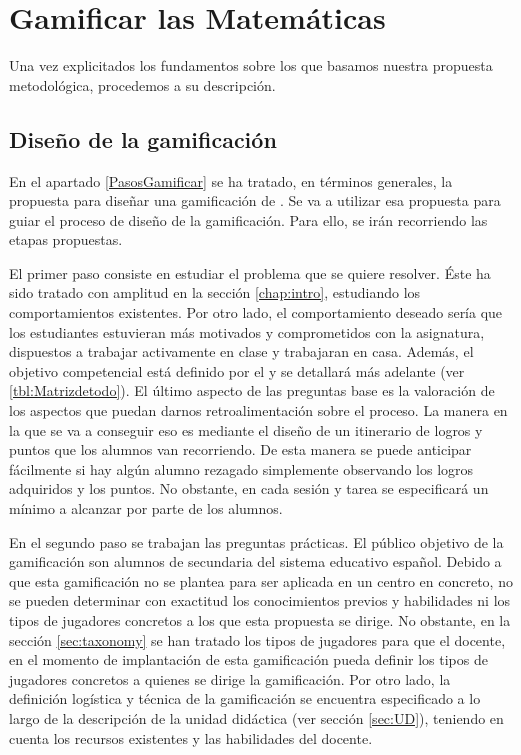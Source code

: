 
\newcommand{\arab}{al-Karaji}
\newcommand{\Arab}{Al-Karaji}
\newcommand{\logro}[2]{\labeltext{#1\xspace}{logro::#2} #1\xspace}


\chapter{Gamificar las Matemáticas}


Una vez explicitados los fundamentos sobre los que basamos nuestra propuesta metodológica, procedemos a su descripción.


\section{Diseño de la gamificación}

En el apartado \ref{PasosGamificar} se ha tratado, en términos generales, la propuesta para diseñar una gamificación de \cite{kapp2013gamification}. 
%
Se va a utilizar esa propuesta para guiar el proceso de diseño de la gamificación. 
%
Para ello, se irán recorriendo las etapas propuestas.

El primer paso consiste en estudiar el problema que se quiere resolver. 
%
Éste ha sido tratado con amplitud en la sección \ref{chap:intro}, estudiando los comportamientos existentes. 
%
Por otro lado, el comportamiento deseado sería que los estudiantes estuvieran más motivados y comprometidos con la asignatura, dispuestos a trabajar activamente en clase y trabajaran en casa.
%
Además, el objetivo competencial está definido por el \bocm y se detallará más adelante (ver \ref{tbl:Matrizdetodo}).
%
El último aspecto de las preguntas base es la valoración de los aspectos que puedan darnos retroalimentación sobre el proceso.
%
La manera en la que se va a conseguir eso es mediante el diseño de un itinerario de logros y puntos que los alumnos van recorriendo.
%
De esta manera se puede anticipar fácilmente si hay algún alumno rezagado simplemente observando los logros adquiridos y los puntos.
%
No obstante, en cada sesión y tarea se especificará un mínimo a alcanzar por parte de los alumnos.

En el segundo paso se trabajan las preguntas prácticas.
%
El público objetivo de la gamificación son alumnos de secundaria del sistema educativo español. 
%
Debido a que esta gamificación no se plantea para ser aplicada en un centro en concreto, no se pueden determinar con exactitud los conocimientos previos y habilidades ni los tipos de jugadores concretos a los que esta propuesta se dirige.
%
No obstante, en la sección \ref{sec:taxonomy} se han tratado los tipos de jugadores para que el docente, en el momento de implantación de esta gamificación pueda definir los tipos de jugadores concretos a quienes se dirige la gamificación.
%
Por otro lado, la definición logística y técnica de la gamificación se encuentra especificado a lo largo de la descripción de la unidad didáctica (ver sección \ref{sec:UD}), teniendo en cuenta los recursos existentes y las habilidades del docente.

